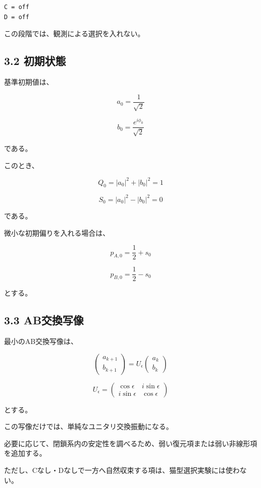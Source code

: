 \documentclass{article}
\begin{document}
\begin{verbatim}
C = off
D = off
\end{verbatim}

この段階では、観測による選択を入れない。

\subsection{3.2 初期状態}\label{ux521dux671fux72b6ux614b}

基準初期値は、

\[
a_0 = \frac{1}{\sqrt{2}}
\]

\[
b_0 = \frac{e^{i\phi_0}}{\sqrt{2}}
\]

である。

このとき、

\[
Q_0 = |a_0|^2 + |b_0|^2 = 1
\]

\[
S_0 = |a_0|^2 - |b_0|^2 = 0
\]

である。

微小な初期偏りを入れる場合は、

\[
p_{A,0} = \frac12 + s_0
\]

\[
p_{B,0} = \frac12 - s_0
\]

とする。

\subsection{3.3 AB交換写像}\label{abux4ea4ux63dbux5199ux50cf}

最小のAB交換写像は、

\[
\begin{pmatrix}
a_{k+1}\\
b_{k+1}
\end{pmatrix}
=
U_\epsilon
\begin{pmatrix}
a_k\\
b_k
\end{pmatrix}
\]

\[
U_\epsilon
=
\begin{pmatrix}
\cos\epsilon & i\sin\epsilon\\
i\sin\epsilon & \cos\epsilon
\end{pmatrix}
\]

とする。

この写像だけでは、単純なユニタリ交換振動になる。

必要に応じて、閉鎖系内の安定性を調べるため、弱い復元項または弱い非線形項を追加する。

ただし、Cなし・Dなしで一方へ自然収束する項は、猫型選択実験には使わない。
\end{document}
